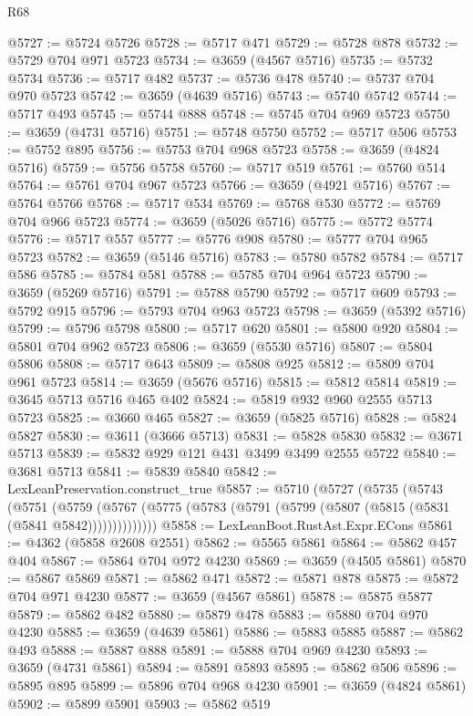 \begin{lexlean}{R68}
\begin{coremodule}
@5727 := @5724 @5726
@5728 := @5717 @471
@5729 := @5728 @878
@5732 := @5729 @704 @971 @5723
@5734 := @3659 (@4567 @5716)
@5735 := @5732 @5734
@5736 := @5717 @482
@5737 := @5736 @478
@5740 := @5737 @704 @970 @5723
@5742 := @3659 (@4639 @5716)
@5743 := @5740 @5742
@5744 := @5717 @493
@5745 := @5744 @888
@5748 := @5745 @704 @969 @5723
@5750 := @3659 (@4731 @5716)
@5751 := @5748 @5750
@5752 := @5717 @506
@5753 := @5752 @895
@5756 := @5753 @704 @968 @5723
@5758 := @3659 (@4824 @5716)
@5759 := @5756 @5758
@5760 := @5717 @519
@5761 := @5760 @514
@5764 := @5761 @704 @967 @5723
@5766 := @3659 (@4921 @5716)
@5767 := @5764 @5766
@5768 := @5717 @534
@5769 := @5768 @530
@5772 := @5769 @704 @966 @5723
@5774 := @3659 (@5026 @5716)
@5775 := @5772 @5774
@5776 := @5717 @557
@5777 := @5776 @908
@5780 := @5777 @704 @965 @5723
@5782 := @3659 (@5146 @5716)
@5783 := @5780 @5782
@5784 := @5717 @586
@5785 := @5784 @581
@5788 := @5785 @704 @964 @5723
@5790 := @3659 (@5269 @5716)
@5791 := @5788 @5790
@5792 := @5717 @609
@5793 := @5792 @915
@5796 := @5793 @704 @963 @5723
@5798 := @3659 (@5392 @5716)
@5799 := @5796 @5798
@5800 := @5717 @620
@5801 := @5800 @920
@5804 := @5801 @704 @962 @5723
@5806 := @3659 (@5530 @5716)
@5807 := @5804 @5806
@5808 := @5717 @643
@5809 := @5808 @925
@5812 := @5809 @704 @961 @5723
@5814 := @3659 (@5676 @5716)
@5815 := @5812 @5814
@5819 := @3645 @5713 @5716 @465 @402
@5824 := @5819 @932 @960 @2555 @5713 @5723
@5825 := @3660 @465
@5827 := @3659 (@5825 @5716)
@5828 := @5824 @5827
@5830 := @3611 (@3666 @5713)
@5831 := @5828 @5830
@5832 := @3671 @5713
@5839 := @5832 @929 @121 @431 @3499 @3499 @2555 @5722
@5840 := @3681 @5713
@5841 := @5839 @5840
@5842 := LexLeanPreservation.construct_true
@5857 := @5710
    (@5727
      (@5735
        (@5743
          (@5751
            (@5759
              (@5767 (@5775 (@5783 (@5791 (@5799 (@5807 (@5815 (@5831 (@5841 @5842))))))))))))))
@5858 := LexLeanBoot.RustAst.Expr.ECons
@5861 := @4362 (@5858 @2608 @2551)
@5862 := @5565 @5861
@5864 := @5862 @457 @404
@5867 := @5864 @704 @972 @4230
@5869 := @3659 (@4505 @5861)
@5870 := @5867 @5869
@5871 := @5862 @471
@5872 := @5871 @878
@5875 := @5872 @704 @971 @4230
@5877 := @3659 (@4567 @5861)
@5878 := @5875 @5877
@5879 := @5862 @482
@5880 := @5879 @478
@5883 := @5880 @704 @970 @4230
@5885 := @3659 (@4639 @5861)
@5886 := @5883 @5885
@5887 := @5862 @493
@5888 := @5887 @888
@5891 := @5888 @704 @969 @4230
@5893 := @3659 (@4731 @5861)
@5894 := @5891 @5893
@5895 := @5862 @506
@5896 := @5895 @895
@5899 := @5896 @704 @968 @4230
@5901 := @3659 (@4824 @5861)
@5902 := @5899 @5901
@5903 := @5862 @519

\end{coremodule}
\end{lexlean}
